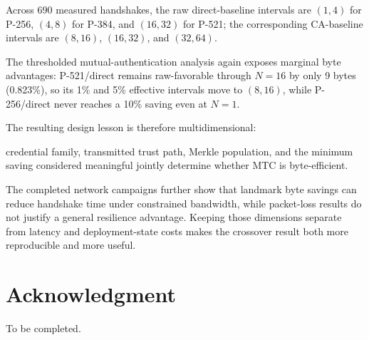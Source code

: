\documentclass[journal]{IEEEtran}
\begin{document}
Across 690 measured handshakes, the raw direct-baseline intervals are $(1,4)$ for P-256, $(4,8)$ for P-384, and $(16,32)$ for P-521; the corresponding CA-baseline intervals are $(8,16)$, $(16,32)$, and $(32,64)$.

The thresholded mutual-authentication analysis again exposes marginal byte advantages: P-521/direct remains raw-favorable through $N=16$ by only 9 bytes (0.823\%), so its 1\% and 5\% effective intervals move to $(8,16)$, while P-256/direct never reaches a 10\% saving even at $N=1$.

The resulting design lesson is therefore multidimensional:

credential family, transmitted trust path, Merkle population, and the minimum saving considered meaningful jointly determine whether MTC is byte-efficient.

The completed network campaigns further show that landmark byte savings can reduce handshake time under constrained bandwidth, while packet-loss results do not justify a general resilience advantage. Keeping those dimensions separate from latency and deployment-state costs makes the crossover result both more reproducible and more useful.



\section*{Acknowledgment}



To be completed.
\end{document}
